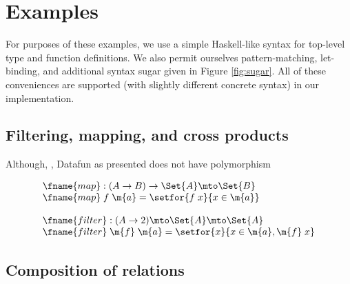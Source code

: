 \documentclass[preprint]{sigplanconf}
\newcommand{\uto}{\to}
\begin{document}

\pagebreak
\section{Examples}

For purposes of these examples, we use a simple Haskell-like syntax for
top-level type and function definitions. We also permit ourselves
pattern-matching, let-binding, and additional syntax sugar given in
Figure \ref{fig:sugar}. All of these conveniences are supported (with slightly
different concrete syntax) in our implementation.





\subsection{Filtering, mapping, and cross products}

Although, , Datafun as presented does not
have polymorphism


\[\begin{array}{l}
\fname{map} : (A \uto B) \to \Set{A} \mto \Set{B}\\
\fname{map}\;f\;\m{a} = \setfor{f\;x}{x \in \m{a}}\\
\\
\fname{filter} : (A \uto 2) \mto \Set{A} \mto \Set{A}\\
\fname{filter}\;\m{f}\;\m{a} = \setfor{x}{x \in \m{a}, \m{f}\; x}
\end{array}\]



\TODO

\subsection{Composition of relations}
\end{document}
